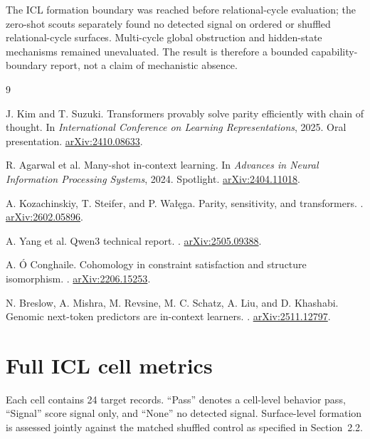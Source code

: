 \documentclass[10pt,a4paper]{article}
\begin{document}
The ICL formation boundary was reached before relational-cycle evaluation; the zero-shot scouts separately found no detected signal on ordered or shuffled relational-cycle surfaces. Multi-cycle global obstruction and hidden-state mechanisms remained unevaluated. The result is therefore a bounded capability-boundary report, not a claim of mechanistic absence.

\begin{thebibliography}{9}
\small
\setlength{\itemsep}{0.45em}
\setlength{\parskip}{0pt}

J. Kim and T. Suzuki.
\newblock Transformers provably solve parity efficiently with chain of thought.
\newblock In \emph{International Conference on Learning Representations}, 2025. Oral presentation. \href{https://arxiv.org/abs/2410.08633}{arXiv:2410.08633}.

R. Agarwal et al.
\newblock Many-shot in-context learning.
\newblock In \emph{Advances in Neural Information Processing Systems}, 2024. Spotlight. \href{https://arxiv.org/abs/2404.11018}{arXiv:2404.11018}.

A. Kozachinskiy, T. Steifer, and P. Wa\l{}\k{e}ga.
\newblock Parity, sensitivity, and transformers.
. \href{https://arxiv.org/abs/2602.05896}{arXiv:2602.05896}.

A. Yang et al.
\newblock Qwen3 technical report.
. \href{https://arxiv.org/abs/2505.09388}{arXiv:2505.09388}.

A. \'O Conghaile.
\newblock Cohomology in constraint satisfaction and structure isomorphism.
. \href{https://arxiv.org/abs/2206.15253}{arXiv:2206.15253}.

N. Breslow, A. Mishra, M. Revsine, M. C. Schatz, A. Liu, and D. Khashabi.
\newblock Genomic next-token predictors are in-context learners.
. \href{https://arxiv.org/abs/2511.12797}{arXiv:2511.12797}.

\end{thebibliography}

\clearpage
\appendix

\section{Full ICL cell metrics}
\label{app:metrics}

Each cell contains 24 target records. ``Pass'' denotes a cell-level behavior pass, ``Signal'' score signal only, and ``None'' no detected signal. Surface-level formation is assessed jointly against the matched shuffled control as specified in Section~2.2.
\end{document}
